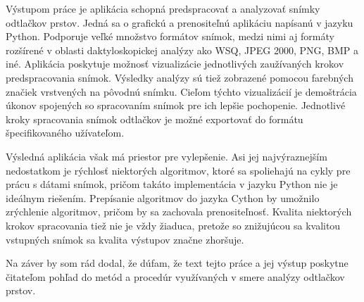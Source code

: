   Výstupom práce je aplikácia schopná predspracovať a analyzovať snímky odtlačkov prstov. Jedná sa o grafickú a prenositeľnú aplikáciu napísanú v jazyku
  Python. Podporuje veľké množstvo formátov snímok, medzi nimi aj formáty rozšírené v oblasti daktyloskopickej analýzy ako WSQ, JPEG 2000, PNG, BMP a iné.
  Aplikácia poskytuje možnosť vizualizácie jednotlivých zaužívaných krokov predspracovania snímok. Výsledky analýzy sú tiež zobrazené pomocou farebných
  značiek vrstvených na pôvodnú snímku. Cieľom týchto vizualizácií je demoštrácia úkonov spojených so spracovaním snímok pre ich lepšie pochopenie.
  Jednotlivé kroky spracovania snímok odtlačkov je možné exportovať do formátu špecifikovaného užívateľom.

  Výsledná aplikácia však má priestor pre vylepšenie. Asi jej najvýraznejším nedostatkom je rýchlosť niektorých algoritmov, ktoré sa spoliehajú na
  cykly pre prácu s dátami snímok, pričom takáto implementácia v jazyku Python nie je ideálnym riešením. Prepísanie algoritmov do jazyka Cython by umožnilo
  zrýchlenie algoritmov, pričom by sa zachovala prenositeľnosť. Kvalita niektorých krokov spracovania tiež nie je vždy žiaduca, pretože so znižujúcou sa kvalitou
  vstupných snímok sa kvalita výstupov značne zhoršuje.

  Na záver by som rád dodal, že dúfam, že text tejto práce a jej výstup poskytne čitateľom pohľad do metód a procedúr využívaných v smere analýzy odtlačkov
  prstov.

